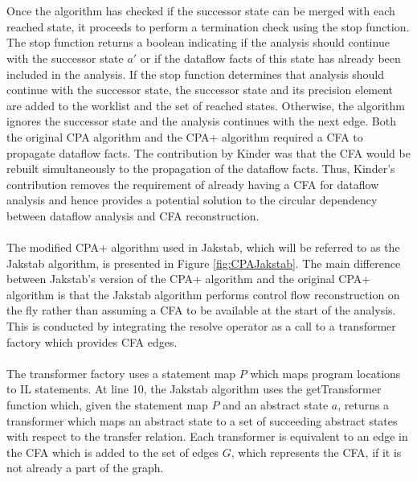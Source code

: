 \documentclass{kththesis}
\begin{document}
\\ \\
Once the algorithm has checked if the successor state can be merged with each reached state, it proceeds to perform a termination check using the stop function. The stop function returns a boolean indicating if the analysis should continue with the successor state $a{'}$ or if the dataflow facts of this state has already been included in the analysis. If the stop function determines that analysis should continue with the successor state, the successor state and its precision element are added to the worklist and the set of reached states. Otherwise, the algorithm ignores the successor state and the analysis continues with the next edge. 
\clearpage
\noindent
Both the original CPA algorithm and the CPA+ algorithm required a CFA to propagate dataflow facts. The contribution by Kinder\cite{Jakstab} was that the CFA would be rebuilt simultaneously to the propagation of the dataflow facts. Thus, Kinder's contribution removes the requirement of already having a CFA for dataflow analysis and hence provides a potential solution to the circular dependency between dataflow analysis and CFA reconstruction.
\\ \\ 
The modified CPA+ algorithm used in Jakstab, which will be referred to as the Jakstab algorithm, is presented in Figure \ref{fig:CPAJakstab}. The main difference between Jakstab's version of the CPA+ algorithm and the original CPA+ algorithm is that the Jakstab algorithm performs control flow reconstruction on the fly rather than assuming a CFA to be available at the start of the analysis. This is conducted by integrating the resolve operator as a call to a transformer factory which provides CFA edges.
\\ \\
The transformer factory uses a statement map $P$ which maps program locations to IL statements. At line 10, the Jakstab algorithm uses the getTransformer function which, given the statement map $P$ and an abstract state $a$, returns a transformer which maps an abstract state to a set of succeeding abstract states with respect to the transfer relation. Each transformer is equivalent to an edge in the CFA which is added to the set of edges $G$, which represents the CFA, if it is not already a part of the graph.
\end{document}
